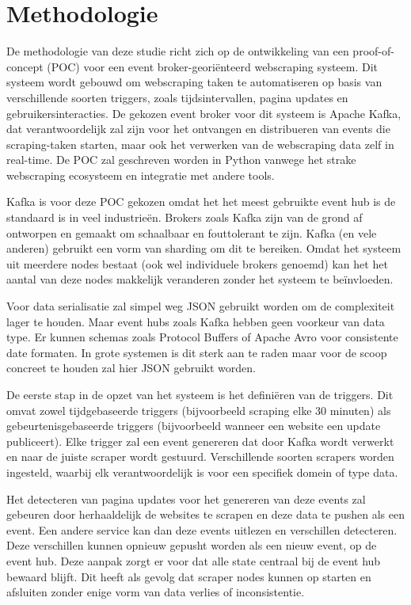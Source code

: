 \section{Methodologie}%
\label{sec:methodologie}

De methodologie van deze studie richt zich op de ontwikkeling van een proof-of-concept (POC) voor een event broker-georiënteerd webscraping systeem. Dit systeem wordt gebouwd om webscraping taken te automatiseren op basis van verschillende soorten triggers, zoals tijdsintervallen, pagina updates en gebruikersinteracties. De gekozen event broker voor dit systeem is Apache Kafka, dat verantwoordelijk zal zijn voor het ontvangen en distribueren van events die scraping-taken starten, maar ook het verwerken van de webscraping data zelf in real-time. De POC zal geschreven worden in Python vanwege het strake webscraping ecosysteem en integratie met andere tools.

Kafka is voor deze POC gekozen omdat het het meest gebruikte event hub is de standaard is in veel industrieën. Brokers zoals Kafka zijn van de grond af ontworpen en gemaakt om schaalbaar en fouttolerant te zijn. Kafka (en vele anderen) gebruikt een vorm van sharding om dit te bereiken. Omdat het systeem uit meerdere nodes bestaat (ook wel individuele brokers genoemd) kan het het aantal van deze nodes makkelijk veranderen zonder het systeem te beïnvloeden.

Voor data serialisatie zal simpel weg JSON gebruikt worden om de complexiteit lager te houden. Maar event hubs zoals Kafka hebben geen voorkeur van data type. Er kunnen schemas zoals Protocol Buffers of Apache Avro voor consistente date formaten. In grote systemen is dit sterk aan te raden maar voor de scoop concreet te houden zal hier JSON gebruikt worden.

De eerste stap in de opzet van het systeem is het definiëren van de triggers. Dit omvat zowel tijdgebaseerde triggers (bijvoorbeeld scraping elke 30 minuten) als gebeurtenisgebaseerde triggers (bijvoorbeeld wanneer een website een update publiceert). Elke trigger zal een event genereren dat door Kafka wordt verwerkt en naar de juiste scraper wordt gestuurd. Verschillende soorten scrapers worden ingesteld, waarbij elk verantwoordelijk is voor een specifiek domein of type data.

Het detecteren van pagina updates voor het genereren van deze events zal gebeuren door herhaaldelijk de websites te scrapen en deze data te pushen als een event. Een andere service kan dan deze events uitlezen en verschillen detecteren. Deze verschillen kunnen opnieuw gepusht worden als een nieuw event, op de event hub. Deze aanpak zorgt er voor dat alle state centraal bij de event hub bewaard blijft. Dit heeft als gevolg dat scraper nodes kunnen op starten en afsluiten zonder enige vorm van data verlies of inconsistentie.


